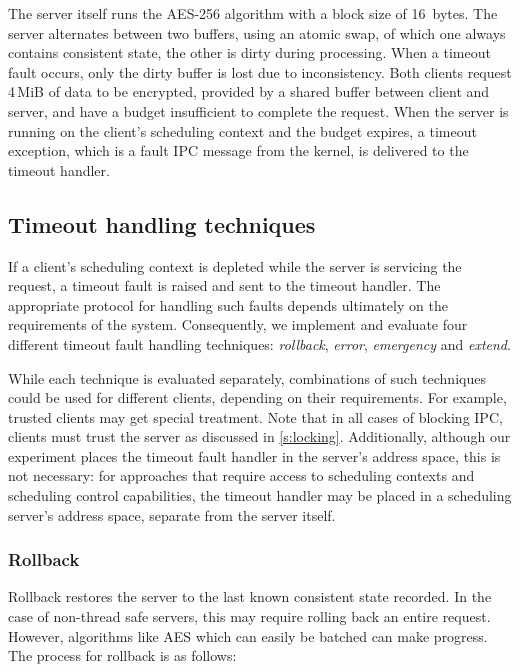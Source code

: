 The server itself runs the AES-256 algorithm with a block size of 16~bytes. The server alternates between two
buffers, using an atomic swap, of which one always contains consistent state, the other is
dirty during processing. When a timeout fault occurs, only the dirty buffer is lost due to
inconsistency. Both clients request 4\,MiB of data to be encrypted, provided by a shared buffer
between client and server, and have a budget insufficient to
complete the request. When the server is running on the client's scheduling context and the budget
expires, a timeout exception, which is a fault IPC message from the kernel, is delivered to the timeout
handler. 

\subsection{Timeout handling techniques}

If a client's scheduling context is depleted while the server is servicing the request, a timeout fault
is raised and sent to the timeout handler.  The appropriate protocol for handling such faults
depends ultimately on the requirements of the system.  Consequently, we implement and evaluate four
different timeout fault handling techniques: \emph{rollback}, \emph{error}, \emph{emergency} and
\emph{extend}. 

While each technique is evaluated separately, combinations of such techniques could be used for
different clients, depending on their requirements. For example, trusted clients may get special
treatment. Note that in all cases of blocking IPC, clients must trust the server as discussed in
\cref{s:locking}. Additionally, although our experiment places 
the timeout fault handler in the server's address
space, this is not necessary: for approaches that require access to scheduling contexts and
scheduling control capabilities, the timeout handler may be placed in a scheduling server's address
space, separate from the server itself.

\subsubsection{Rollback}

Rollback restores the server to the last known consistent state recorded. In the case of non-thread
safe servers, this may require rolling back an entire request. However, algorithms like \gls{AES}
which can easily be batched can make progress. The process for rollback is as follows:

